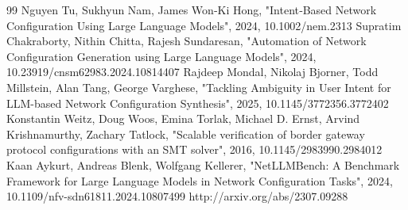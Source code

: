 \documentclass[conference]{IEEEtran}
\begin{document}
\begin{thebibliography}{99}
 Nguyen Tu, Sukhyun Nam, James Won‐Ki Hong, "Intent‐Based Network Configuration Using Large Language Models", 2024, 10.1002/nem.2313
 Supratim Chakraborty, Nithin Chitta, Rajesh Sundaresan, "Automation of Network Configuration Generation using Large Language Models", 2024, 10.23919/cnsm62983.2024.10814407
 Rajdeep Mondal, Nikolaj Bjorner, Todd Millstein, Alan Tang, George Varghese, "Tackling Ambiguity in User Intent for LLM-based Network Configuration Synthesis", 2025, 10.1145/3772356.3772402
 Konstantin Weitz, Doug Woos, Emina Torlak, Michael D. Ernst, Arvind Krishnamurthy, Zachary Tatlock, "Scalable verification of border gateway protocol configurations with an SMT solver", 2016, 10.1145/2983990.2984012
 Kaan Aykurt, Andreas Blenk, Wolfgang Kellerer, "NetLLMBench: A Benchmark Framework for Large Language Models in Network Configuration Tasks", 2024, 10.1109/nfv-sdn61811.2024.10807499
 http://arxiv.org/abs/2307.09288
\end{thebibliography}
\end{document}
